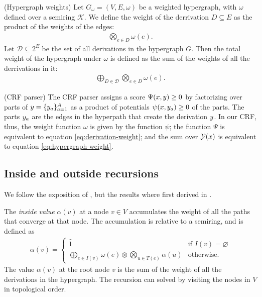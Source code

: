   \begin{definition}{(Hypergraph weights)} Let $G_{\omega} = (V, E, \omega)$ be a weighted hypergraph, with $\omega$ defined over a semiring $\mathcal{K}$. We define the weight of the derrivation $D \subseteq E$ as the product of the weights of the edges:
  \begin{align}
    \label{eq:derivation-weight}
    \bigotimes_{e \in D} \omega(e).
  \end{align}
  Let $\mathcal{D} \subseteq 2^E$ be the set of all derivations in the hypergraph $G$. Then the total weight of the hypergraph under $\omega$ is defined as the sum of the weights of all the derrivations in it:
  \begin{align}
    \label{eq:hypergraph-weight}
    \bigoplus_{D \in \mathcal{D}} \bigotimes_{e \in D} \omega(e).
  \end{align}
  \end{definition}

  \begin{example}{(CRF parser)}
    The CRF parser assigns a score $\Psi(x, y) \geq 0$ by factorizing over parts of $y = \{ y_a \}_{a=1}^{A}$ as a product of potentials $\psi(x, y_a) \geq 0$ of the parts. The parts $y_a$ are the edges in the hyperpath that create the derivation $y$. In our CRF, thus, the weight function $\omega$ is given by the function $\psi$; the function $\Psi$ is equivalent to equation \ref{eq:derivation-weight}; and the sum over $\mathcal{Y}(x)$ is equivalent to equation \ref{eq:hypergraph-weight}.
  \end{example}

  \subsection{Inside and outside recursions}
  We follow the exposition of \citet{eisner2009semirings}, but the results where first derived in \citet{goodman1999semiring}.

  \begin{definition}{} The \textit{inside value} $\alpha(v)$ at a node $v \in V$ accumulates the weight of all the paths that converge at that node. The accumulation is relative to a semiring, and is defined as
  \begin{align*}
    \alpha(v) =
      \begin{cases}
        \hat{1}  &  \mbox{if } I(v) = \varnothing  \\
        \displaystyle\bigoplus_{e \in I(v)} \omega(e) \otimes \displaystyle\bigotimes_{u \in T(e)} \alpha(u)  & \mbox{otherwise.}
      \end{cases}
  \end{align*}
  The value $\alpha(v)$ at the root node $v$ is the sum of the weight of all the derivations in the hypergraph. The recursion can solved by visiting the nodes in $V$ in topological order.
  \end{definition}

